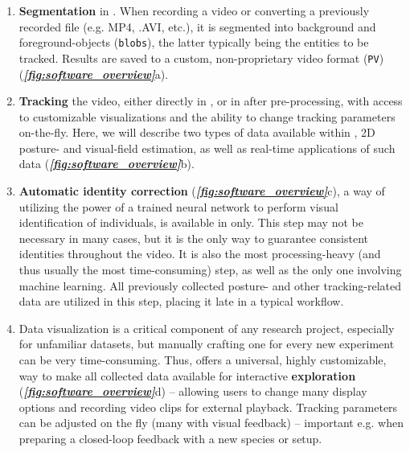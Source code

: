 \documentclass[9pt,lineno]{elife}
\newcommand{\figref}[1]{\textit{\textbf{\ref{#1}}}}
\newcommand{\TRex}{\protect\path{TRex}}
\newcommand{\TGrabs}{\protect\path{TGrabs}}
\newcommand{\changemade}[1]{#1}
\begin{document}
\begin{enumerate}
    \item \textbf{Segmentation} in \TGrabs{}. When recording a video or converting a previously recorded file (e.g. MP4, .AVI, etc.), it is segmented into background and foreground-objects (\verb!blobs!), the latter typically being the entities to be tracked. Results are saved to a custom, non-proprietary video format (\verb!PV!)  (\figref{fig:software_overview}a).
    \item \textbf{Tracking} the video, either directly in \TGrabs{}, or \changemade{in \TRex{} after pre-processing,} with access to customizable visualizations and the ability to change tracking parameters on-the-fly. Here, we will describe two types of data available within \TRex{}, 2D posture- and visual-field estimation, as well as real-time applications of such data  (\figref{fig:software_overview}b).
    \item \changemade{\textbf{Automatic identity correction} (\figref{fig:software_overview}c), a way of utilizing the power of a trained neural network to perform visual identification of individuals, is available in \TRex{} only.} This step may not be necessary in many cases, but it is the only way to guarantee consistent identities throughout the video. It is also the \changemade{most processing-heavy (and thus usually the most time-consuming)} step, as well as the only one involving machine learning. All previously collected posture- and other tracking-related data are utilized in this step, placing it late in a typical workflow.
    \item Data visualization is a critical component of any research project, especially for unfamiliar datasets, but manually crafting one for every new experiment can be very time-consuming. Thus, \TRex{} offers a universal, highly customizable, way to make all collected data available for interactive \textbf{exploration} (\figref{fig:software_overview}d) -- allowing users to change many display options and recording video clips for external playback. Tracking parameters can be adjusted on the fly (many with visual feedback) -- important e.g. when preparing a closed-loop feedback with a new species or setup.
\end{enumerate}
\end{document}
